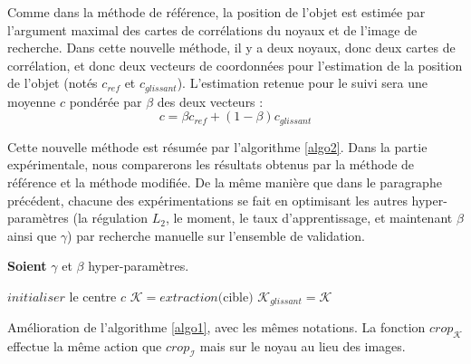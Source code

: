 \documentclass[10pt,twocolumn,letterpaper,french]{article}
\begin{document}
Comme dans la méthode de référence, la position de l'objet est estimée par l'argument maximal des cartes de corrélations du noyaux et de l'image de recherche. Dans cette nouvelle méthode, il y a deux noyaux, donc deux cartes de corrélation, et donc deux vecteurs de coordonnées pour l'estimation de la position de l'objet (notés $c_{ref}$ et $c_{glissant}$). L'estimation retenue pour le suivi sera une moyenne $c$ pondérée par $\beta$ des deux vecteurs :
$$c = \beta c_{ref} + (1-\beta) c_{glissant}$$

Cette nouvelle méthode est résumée par l'algorithme \ref{algo2}. Dans la partie expérimentale, nous comparerons les résultats obtenus par la méthode de référence et la méthode modifiée. De la même manière que dans le paragraphe précédent, chacune des expérimentations se fait en optimisant les autres hyper-paramètres (la régulation $L_2$, le moment, le taux d'apprentissage, et maintenant $\beta$ ainsi que $\gamma$) par recherche manuelle sur l'ensemble de validation.\\

\begin{algorithm}
\label{algo2}
\textbf{Soient} $\gamma$ et $\beta$ hyper-paramètres.

\SetAlgoLined
 $initialiser$ le centre $c$ \;
 $\mathcal{K} = extraction($cible$)$\;
 $\mathcal{K}_{glissant} = \mathcal{K}$\;
\caption{Amélioration de l'algorithme \ref{algo1}, avec les mêmes notations. La fonction $crop_{\mathcal{K}}$ effectue la même action que $crop_{\mathcal{I}}$ mais sur le noyau au lieu des images.}
\end{algorithm}
\end{document}
